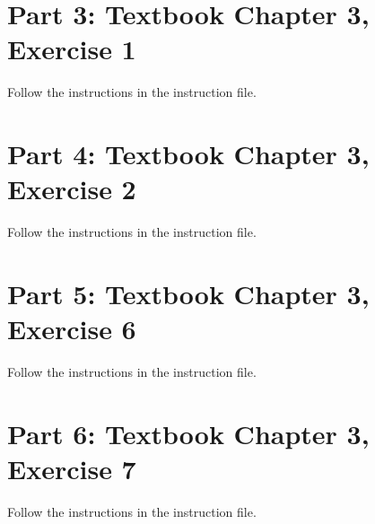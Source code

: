 \documentclass[
]{article}
\begin{document}
\hypertarget{part-3-textbook-chapter-3-exercise-1}{%
\section{Part 3: Textbook Chapter 3, Exercise
1}\label{part-3-textbook-chapter-3-exercise-1}}

Follow the instructions in the instruction file.

\hypertarget{part-4-textbook-chapter-3-exercise-2}{%
\section{Part 4: Textbook Chapter 3, Exercise
2}\label{part-4-textbook-chapter-3-exercise-2}}

Follow the instructions in the instruction file.

\hypertarget{part-5-textbook-chapter-3-exercise-6}{%
\section{Part 5: Textbook Chapter 3, Exercise
6}\label{part-5-textbook-chapter-3-exercise-6}}

Follow the instructions in the instruction file.

\hypertarget{part-6-textbook-chapter-3-exercise-7}{%
\section{Part 6: Textbook Chapter 3, Exercise
7}\label{part-6-textbook-chapter-3-exercise-7}}

Follow the instructions in the instruction file.
\end{document}
